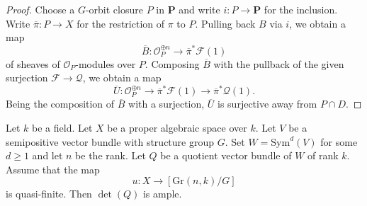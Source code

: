 \begin{proof}
Choose a $G$-orbit closure $P$ in $\mathbf{P}$ and write $i : P \to \mathbf{P}$
for the inclusion.
Write $\overline{\pi} : P \to X$ for the restriction of $\pi$ to $P$.
Pulling back $B$ via $i$, we obtain a map
$$
  \overline{B} : \mathcal{O}_P^{\oplus n} \to \overline{\pi}^* \mathcal{F}(1)
$$
of sheaves of $\mathcal{O}_P$-modules over $P$.
Composing $\overline{B}$ with the pullback of the given surjection
$\mathcal{F} \to \mathcal{Q}$, we obtain a map
$$
  \overline{U} : \mathcal{O}_P^{\oplus n} \to
                  \overline{\pi}^*\mathcal{F}(1) \to
                  \overline{\pi}^*\mathcal{Q}(1).
$$
Being the composition of $\overline{B}$ with a surjection, $\overline{U}$ is
surjective away from $P \cap D$.
\end{proof}

\begin{lemma}
Let $k$ be a field.
Let $X$ be a proper algebraic space over $k$.
Let $V$ be a semipositive vector bundle with structure group $G$.
Set $W = \mathrm{Sym}^d(V)$ for some $d \geq 1$ and let $n$ be the rank.
Let $Q$ be a quotient vector bundle of $W$ of rank $k$.
Assume that the map
$$
u : X \to [\mathrm{Gr}(n,k)/G]
$$
is quasi-finite.
Then $\det(Q)$ is ample.
\end{lemma}

